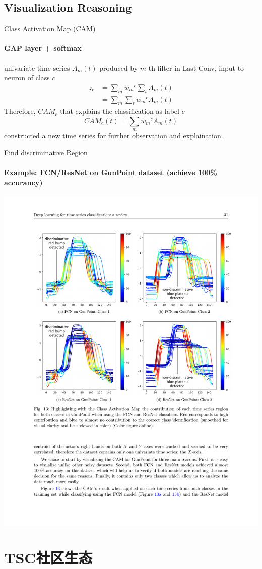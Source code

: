 \documentclass[aspectratio=169]{ctexbeamer}
\begin{document}
\begin{frame}{}
\begin{center}
	\end{center}
\end{frame}

\subsection{Visualization Reasoning}

\begin{frame}{Class Activation Map (CAM) }
	\framesubtitle{GAP layer + softmax}
	univariate time series $A_{m}(t)$ produced by $m$-th filter in Last Conv, input to neuron of class $c$
	$$\begin{aligned}
			z_c & = \sum_{m}{{w_m}^c \sum_{t}{A_m(t)}} \\
			    & =  \sum_{m}{\sum_{t} {{w_m}^c A_m(t)}}
		\end{aligned}$$
	Therefore, $CAM_c$ that explains the classification as label $c$
	$$CAM_c (t)= \sum_{m}{{w_m}^c A_m(t)}$$
	constructed a new time series for further observation and explaination.
\end{frame}

\begin{frame}{Find discriminative Region}
	\framesubtitle{Example: FCN/ResNet on GunPoint dataset (achieve 100\% accurancy)}
	\begin{center}
		\includegraphics[width=.6\textwidth]{figure/cam_example}
	\end{center}
\end{frame}

\section{TSC社区生态}
\end{document}
